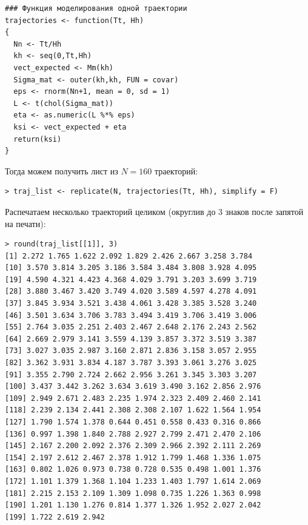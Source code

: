 \documentclass[14pt,a4paper]{scrartcl}
\begin{document}
\begin{verbatim}
### Функция моделирования одной траектории
trajectories <- function(Tt, Hh)
{
  Nn <- Tt/Hh
  kh <- seq(0,Tt,Hh)
  vect_expected <- Mm(kh)
  Sigma_mat <- outer(kh,kh, FUN = covar)
  eps <- rnorm(Nn+1, mean = 0, sd = 1)
  L <- t(chol(Sigma_mat))
  eta <- as.numeric(L %*% eps)
  ksi <- vect_expected + eta
  return(ksi)
}
\end{verbatim}
	
Тогда можем получить лист из $N=160$ траекторий:

\begin{verbatim}
> traj_list <- replicate(N, trajectories(Tt, Hh), simplify = F)
\end{verbatim}	

	
Распечатаем несколько траекторий целиком (округлив до 3 знаков после запятой на печати):

\begin{verbatim}
> round(traj_list[[1]], 3)
[1] 2.272 1.765 1.622 2.092 1.829 2.426 2.667 3.258 3.784
[10] 3.570 3.814 3.205 3.186 3.584 3.484 3.808 3.928 4.095
[19] 4.590 4.321 4.423 4.368 4.029 3.791 3.203 3.699 3.719
[28] 3.880 3.467 3.420 3.749 4.020 3.589 4.597 4.278 4.091
[37] 3.845 3.934 3.521 3.438 4.061 3.428 3.385 3.528 3.240
[46] 3.501 3.634 3.706 3.783 3.494 3.419 3.706 3.419 3.006
[55] 2.764 3.035 2.251 2.403 2.467 2.648 2.176 2.243 2.562
[64] 2.669 2.979 3.141 3.559 4.139 3.857 3.372 3.519 3.387
[73] 3.027 3.035 2.987 3.160 2.871 2.836 3.158 3.057 2.955
[82] 3.362 3.931 3.834 4.187 3.787 3.393 3.061 3.276 3.025
[91] 3.355 2.790 2.724 2.662 2.956 3.261 3.345 3.303 3.207
[100] 3.437 3.442 3.262 3.634 3.619 3.490 3.162 2.856 2.976
[109] 2.949 2.671 2.483 2.235 1.974 2.323 2.409 2.460 2.141
[118] 2.239 2.134 2.441 2.308 2.308 2.107 1.622 1.564 1.954
[127] 1.790 1.574 1.378 0.644 0.451 0.558 0.433 0.316 0.866
[136] 0.997 1.398 1.840 2.788 2.927 2.799 2.471 2.470 2.106
[145] 2.167 2.200 2.092 2.376 2.309 2.966 2.392 2.111 2.269
[154] 2.197 2.612 2.467 2.378 1.912 1.799 1.468 1.336 1.075
[163] 0.802 1.026 0.973 0.738 0.728 0.535 0.498 1.001 1.376
[172] 1.101 1.379 1.368 1.104 1.233 1.403 1.797 1.614 2.069
[181] 2.215 2.153 2.109 1.309 1.098 0.735 1.226 1.363 0.998
[190] 1.201 1.130 1.276 0.814 1.377 1.326 1.952 2.027 2.042
[199] 1.722 2.619 2.942
\end{verbatim}
	
\end{document}
